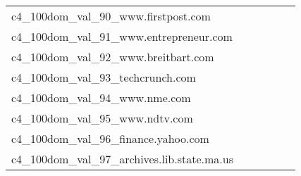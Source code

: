 {\begin{longtable}{m{6cm}m{1.7cm}m{1.7cm}m{1.7cm}m{1.7cm}m{1.7cm}}
	c4\_100dom\_val\_90\_www.firstpost.com  & \colorbox[HTML]{ffffe5}{\makebox[\mywidth][c]{11.71}} & \colorbox[HTML]{f7fcbb}{\makebox[\mywidth][c]{11.24}} & \colorbox[HTML]{ffffe5}{\makebox[\mywidth][c]{12.08}} & \colorbox[HTML]{dff2a7}{\makebox[\mywidth][c]{11.12}} & \colorbox[HTML]{77c578}{\makebox[\mywidth][c]{10.96}}\\
	c4\_100dom\_val\_91\_www.entrepreneur.com  & \colorbox[HTML]{fefee0}{\makebox[\mywidth][c]{13.10}} & \colorbox[HTML]{d7efa2}{\makebox[\mywidth][c]{12.68}} & \colorbox[HTML]{ffffe5}{\makebox[\mywidth][c]{13.65}} & \colorbox[HTML]{e3f4aa}{\makebox[\mywidth][c]{12.72}} & \colorbox[HTML]{77c578}{\makebox[\mywidth][c]{12.54}}\\
	c4\_100dom\_val\_92\_www.breitbart.com  & \colorbox[HTML]{fefee2}{\makebox[\mywidth][c]{13.47}} & \colorbox[HTML]{b2df90}{\makebox[\mywidth][c]{12.67}} & \colorbox[HTML]{ffffe5}{\makebox[\mywidth][c]{14.29}} & \colorbox[HTML]{e5f4ab}{\makebox[\mywidth][c]{12.84}} & \colorbox[HTML]{77c578}{\makebox[\mywidth][c]{12.56}}\\
	c4\_100dom\_val\_93\_techcrunch.com  & \colorbox[HTML]{fcfed7}{\makebox[\mywidth][c]{14.20}} & \colorbox[HTML]{b2df90}{\makebox[\mywidth][c]{13.68}} & \colorbox[HTML]{ffffe5}{\makebox[\mywidth][c]{15.18}} & \colorbox[HTML]{e1f3a9}{\makebox[\mywidth][c]{13.82}} & \colorbox[HTML]{77c578}{\makebox[\mywidth][c]{13.58}}\\
	c4\_100dom\_val\_94\_www.nme.com  & \colorbox[HTML]{fefee0}{\makebox[\mywidth][c]{14.12}} & \colorbox[HTML]{bee496}{\makebox[\mywidth][c]{13.28}} & \colorbox[HTML]{ffffe5}{\makebox[\mywidth][c]{15.06}} & \colorbox[HTML]{e4f4ab}{\makebox[\mywidth][c]{13.43}} & \colorbox[HTML]{77c578}{\makebox[\mywidth][c]{13.12}}\\
	c4\_100dom\_val\_95\_www.ndtv.com  & \colorbox[HTML]{ffffe5}{\makebox[\mywidth][c]{10.66}} & \colorbox[HTML]{f9fcc6}{\makebox[\mywidth][c]{10.26}} & \colorbox[HTML]{ffffe5}{\makebox[\mywidth][c]{10.90}} & \colorbox[HTML]{d0ec9e}{\makebox[\mywidth][c]{10.10}} & \colorbox[HTML]{77c578}{\makebox[\mywidth][c]{10.00}}\\
	c4\_100dom\_val\_96\_finance.yahoo.com  & \colorbox[HTML]{ffffe5}{\makebox[\mywidth][c]{9.96}} & \colorbox[HTML]{f7fcba}{\makebox[\mywidth][c]{9.55}} & \colorbox[HTML]{ffffe5}{\makebox[\mywidth][c]{10.22}} & \colorbox[HTML]{cae99c}{\makebox[\mywidth][c]{9.43}} & \colorbox[HTML]{77c578}{\makebox[\mywidth][c]{9.34}}\\
	c4\_100dom\_val\_97\_archives.lib.state.ma.us  & \colorbox[HTML]{fefee2}{\makebox[\mywidth][c]{6.53}} & \colorbox[HTML]{f3fab6}{\makebox[\mywidth][c]{6.12}} & \colorbox[HTML]{ffffe5}{\makebox[\mywidth][c]{7.09}} & \colorbox[HTML]{fbfdd0}{\makebox[\mywidth][c]{6.27}} & \colorbox[HTML]{77c578}{\makebox[\mywidth][c]{5.85}}\\

\end{longtable}}
